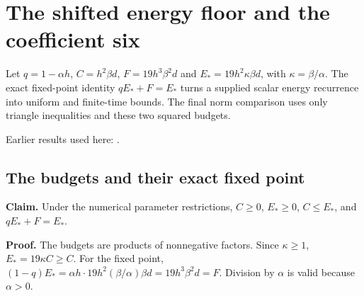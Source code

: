 \documentclass[11pt,a4paper]{report}
\begin{document}
\section{\texorpdfstring{The shifted energy floor and the coefficient six}{The shifted energy floor and the coefficient six}}
\label{proof-module-WassersteinMixing-Recurrence-lean}


Let \(q=1-\alpha h\), \(C=h^2\beta d\), \(F=19h^3\beta^2d\) and \(E_*=19h^2\kappa\beta d\), with \(\kappa=\beta/\alpha\). The exact fixed-point identity \(qE_*+F=E_*\) turns a supplied scalar energy recurrence into uniform and finite-time bounds. The final norm comparison uses only triangle inequalities and these two squared budgets.



Earlier results used here: \cite[Section~3.15]{LangevinLean2026ULASC}.
\subsection{\texorpdfstring{The budgets and their exact fixed point}{The budgets and their exact fixed point}}
\label{report-step-WassersteinMixing-Recurrence-lean-1}


\textbf{Claim.} Under the numerical parameter restrictions, \(C\ge0\), \(E_*\ge0\), \(C\le E_*\), and \(qE_*+F=E_*\).




\textbf{Proof.} The budgets are products of nonnegative factors. Since \(\kappa\ge1\), \(E_*=19\kappa C\ge C\). For the fixed point, \((1-q)E_*=\alpha h\cdot19h^2(\beta/\alpha)\beta d=19h^3\beta^2d=F\). Division by \(\alpha\) is valid because \(\alpha>0\).
\end{document}
